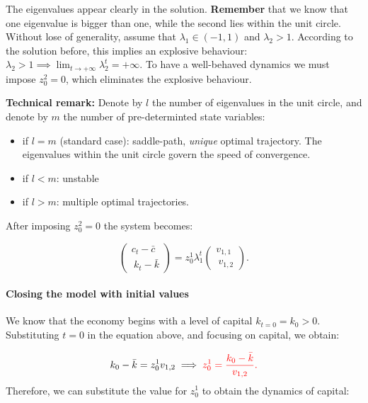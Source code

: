 \documentclass[11pt,a4paper,english]{article}
\providecommand{\tightlist}{%
  \setlength{\itemsep}{0pt}\setlength{\parskip}{0pt}}
\begin{document}
The eigenvalues appear clearly in the solution. \textbf{Remember} that
we know that one eigenvalue is bigger than one, while the second lies
within the unit circle. Without lose of generality, assume that
\(\lambda_{1} \in (-1,1)\) and \(\lambda_{2} > 1.\) According to the
solution before, this implies an explosive behaviour:
\(\lambda_{2} > 1 \implies \lim_{t \rightarrow +\infty} \lambda_{2}^{t} = +\infty.\)
To have a well-behaved dynamics we must impose \(z_{0}^{2} = 0\), which
eliminates the explosive behaviour.

\textbf{Technical remark:} Denote by \(l\) the number of eigenvalues in
the unit circle, and denote by \(m\) the number of pre-determinted state
variables:

\begin{itemize}
\tightlist
\item
  if \(l=m\) (standard case): saddle-path, \emph{unique} optimal
  trajectory. The eigenvalues within the unit circle govern the speed of
  convergence.
\item
  if \(l < m\): unstable
\item
  if \(l > m\): multiple optimal trajectories.
\end{itemize}

After imposing \(z_{0}^{2} = 0\) the system becomes:

\[\begin{pmatrix} c_{t} - \bar{c} \\\ k_{t} - \bar{k} \end{pmatrix} = z_{0}^{1} \lambda_{1}^{t} \begin{pmatrix} v_{1,1} \\\ v_{1,2} \end{pmatrix}.\]

\hypertarget{closing-the-model-with-initial-values}{%
\paragraph{Closing the model with initial
values}\label{closing-the-model-with-initial-values}}

We know that the economy begins with a level of capital
\(k_{t=0} = k_{0} > 0.\) Substituting \(t=0\) in the equation above, and
focusing on capital, we obtain:

\[k_{0} - \bar{k} = z_{0}^{1} v_{1,2} \implies \color{red}{z_{0}^{1} = \frac{k_{0} - \bar{k}}{v_{1,2}}}.\]
Therefore, we can substitute the value for \(z_{0}^{1}\) to obtain the
dynamics of capital:
\end{document}
